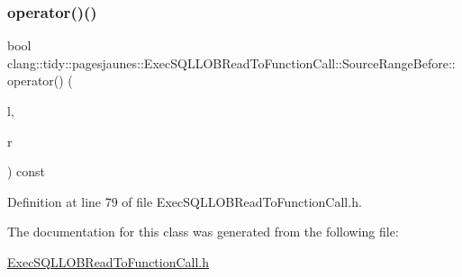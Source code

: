 \subsubsection{\texorpdfstring{operator()()}{operator()()}}
{\footnotesize\ttfamily bool clang\+::tidy\+::pagesjaunes\+::\+Exec\+S\+Q\+L\+L\+O\+B\+Read\+To\+Function\+Call\+::\+Source\+Range\+Before\+::operator() (\begin{DoxyParamCaption}\item[{const \hyperlink{classclang_1_1tidy_1_1pagesjaunes_1_1_exec_s_q_l_l_o_b_read_to_function_call_1_1_source_range_for_integer_n_string_literals}{Source\+Range\+For\+Integer\+N\+String\+Literals} \&}]{l,  }\item[{const \hyperlink{classclang_1_1tidy_1_1pagesjaunes_1_1_exec_s_q_l_l_o_b_read_to_function_call_1_1_source_range_for_integer_n_string_literals}{Source\+Range\+For\+Integer\+N\+String\+Literals} \&}]{r }\end{DoxyParamCaption}) const\hspace{0.3cm}{\ttfamily [inline]}}



Definition at line 79 of file Exec\+S\+Q\+L\+L\+O\+B\+Read\+To\+Function\+Call.\+h.



The documentation for this class was generated from the following file\+:\begin{DoxyCompactItemize}
\item 
\hyperlink{_exec_s_q_l_l_o_b_read_to_function_call_8h}{Exec\+S\+Q\+L\+L\+O\+B\+Read\+To\+Function\+Call.\+h}\end{DoxyCompactItemize}
